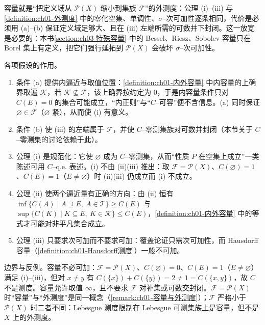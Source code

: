 \documentclass[../../main.tex]{subfiles}%
\begin{document}
\begin{remark}\label{remark:ch01-容量动机}
容量就是“把定义域从 $\mathcal{P}(X)$ 缩小到集族 $\mathcal{F}$”的外测度：公理 (i)--(iii) 与\cref{definition:ch01-外测度} 中的零化空集、单调性、$\sigma$--次可加性逐条相同，代价是必须用 (a)--(b) 保证定义域足够大、且在 (iii) 左端所需的可数并下封闭。这一放宽是必要的：本书\cref{section:ch03-特殊容量} 中的 Bessel、Riesz、Sobolev 容量只在 Borel 集上有定义，把它们强行延拓到 $\mathcal{P}(X)$ 会破坏 $\sigma$--次可加性。

各项假设的作用。
\begin{enumerate}[(1)]
\item 条件 (a) 提供内逼近与取值位置：\cref{definition:ch01-内外容量} 中内容量的上确界取遍 $\mathcal{K}$，若 $\mathcal{K}\not\subseteq\mathcal{F}$，该上确界按约定为 $0$，于是内容量条件只对 $C(E)=0$ 的集合可能成立，“内正则”与“$C$--可容”便不含信息。(a) 同时保证 $\varnothing\in\mathcal{F}$（$\varnothing$ 紧），从而使 (i) 有意义。
\item 条件 (b) 使 (iii) 的左端属于 $\mathcal{F}$，并使 $C$--零测集族对可数并封闭（本节关于 $C$--零测集的讨论依赖于此）。
\item 公理 (i) 是规范化：它使 $\varnothing$ 成为 $C$--零测集，从而“性质 $P$ 在空集上成立”一类陈述可用 $C$--q.e. 表述。(i) 不由 (ii)(iii) 推出：取 $\mathcal{F}=\mathcal{P}(X)$、$C(\varnothing)=1$、$C(E)=1$（$E\neq\varnothing$）时 (ii)(iii) 仍成立而 (i) 不成立。
\item 公理 (ii) 使两个逼近量有正确的方向：由 (ii) 恒有 $\inf\{C(A)\mid A\supseteq E,\ A\in\mathcal{T}\}\geqslant C(E)$ 与 $\sup\{C(K)\mid K\subseteq E,\ K\in\mathcal{K}\}\leqslant C(E)$，\cref{definition:ch01-内外容量} 中的等式才可能对非平凡集合成立。
\item 公理 (iii) 只要求次可加而不要求可加：覆盖论证只需次可加性，而 Hausdorff 容量（\cref{definition:ch01-Hausdorff测度}）一般不可加。
\end{enumerate}

边界与反例。容量不必可加：$\mathcal{F}=\mathcal{P}(X)$、$C(\varnothing)=0$、$C(E)=1$（$E\neq\varnothing$）满足 (i)--(iii)，但对 $x\neq y$ 有 $C(\{x\})+C(\{y\})=2\neq 1=C(\{x,y\})$，故 $C$ 不是测度。容量允许取值 $\infty$，且不要求 $\mathcal{F}$ 对补集或可数交封闭。$\mathcal{F}=\mathcal{P}(X)$ 时“容量”与“外测度”是同一概念（\cref{remark:ch01-容量与外测度}）；$\mathcal{F}$ 严格小于 $\mathcal{P}(X)$ 时二者不同：Lebesgue 测度限制在 Lebesgue 可测集族上是容量，但不是 $X$ 上的外测度。
\end{remark}
\end{document}
